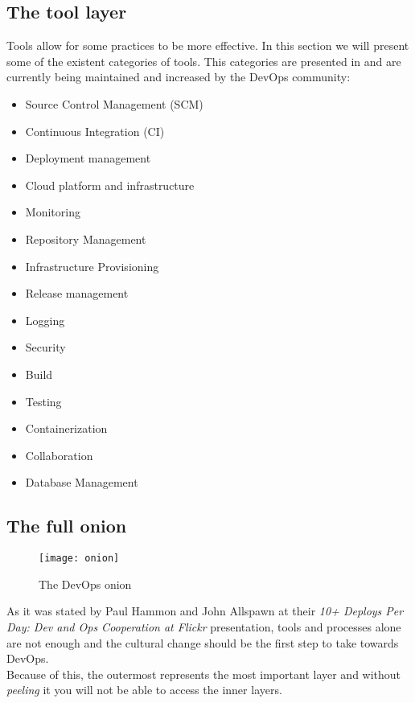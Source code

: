       \subsection{The tool layer} \label{chap:stateoftheart:sec:devops:sec:tools}
      Tools allow for some practices to be more effective. In this section we will present some of the existent categories of tools. This categories are presented in \cite{Labs} and are currently being maintained and increased by the DevOps community:
      \begin{multicols}{3}
        \begin{itemize}
            \item Source Control Management (SCM)
            \item Continuous Integration (CI)
            \item Deployment management
            \item Cloud platform and infrastructure
            \item Monitoring
        \end{itemize}
        \begin{itemize}
            \item Repository Management
            \item Infrastructure Provisioning
            \item Release management
            \item Logging
            \item Security
        \end{itemize}
        \begin{itemize}
            \item Build
            \item Testing
            \item Containerization
            \item Collaboration
            \item Database Management
        \end{itemize}
      \end{multicols}
\pagebreak
      \subsection{The full onion} \label{chap:stateoftheart:sec:devops:sec:onion}
        \begin{wrapfigure}{R}{0.4\textwidth}
            \center
            \texttt{[image: onion]}
            \caption{The DevOps onion \cite{DaveSayers2013}}
            \label{fig:onion}
        \end{wrapfigure}
        As it was stated by Paul Hammon and John Allspawn at their \textit{10+ Deploys Per Day: Dev and Ops Cooperation at Flickr} presentation, tools and processes alone are not enough and the cultural change should be the first step to take towards DevOps. \\
        Because of this, the outermost represents the most important layer and without \textit{peeling} it you will not be able to access the inner layers.

